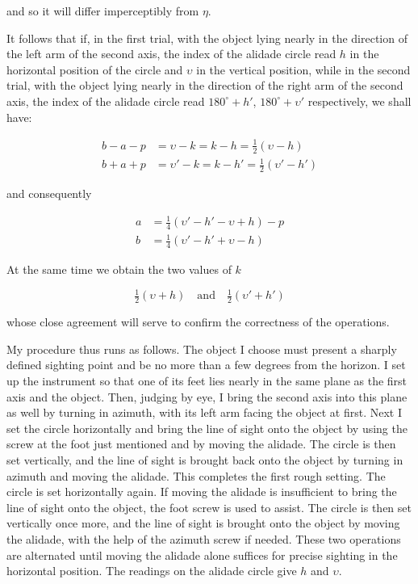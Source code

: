 \noindent and so it will differ imperceptibly from $\eta$.

\par\indent It follows that if, in the first trial, with the object lying nearly in the direction of the left arm of the second axis, the index of the alidade circle read $h$ in the horizontal position of the circle and $\upsilon$ in the vertical position, while in the second trial, with the object lying nearly in the direction of the right arm of the second axis, the index of the alidade circle read $180^\circ+h'$, $180^\circ+\upsilon'$ respectively, we shall have:

\[ \begin{aligned} b-a-p &= \upsilon-k = k-h = \tfrac{1}{2}(\upsilon-h) \\ b+a+p &= \upsilon'-k = k-h' = \tfrac{1}{2}(\upsilon'-h') \end{aligned} \]

\noindent and consequently

\[ \begin{aligned} a &= \tfrac{1}{4}(\upsilon'-h'-\upsilon+h)-p \\ b &= \tfrac{1}{4}(\upsilon'-h'+\upsilon-h) \end{aligned} \]

\noindent At the same time we obtain the two values of $k$

\[ \tfrac{1}{2}(\upsilon+h) \quad\text{and}\quad \tfrac{1}{2}(\upsilon'+h') \]

\noindent whose close agreement will serve to confirm the correctness of the operations.

\par\indent My procedure thus runs as follows. The object I choose must present a sharply defined sighting point and be no more than a few degrees from the horizon. I set up the instrument so that one of its feet lies nearly in the same plane as the first axis and the object. Then, judging by eye, I bring the second axis into this plane as well by turning in azimuth, with its left arm facing the object at first. Next I set the circle horizontally and bring the line of sight onto the object by using the screw at the foot just mentioned and by moving the alidade. The circle is then set vertically, and the line of sight is brought back onto the object by turning in azimuth and moving the alidade. This completes the first rough setting. The circle is set horizontally again. If moving the alidade is insufficient to bring the line of sight onto the object, the foot screw is used to assist. The circle is then set vertically once more, and the line of sight is brought onto the object by moving the alidade, with the help of the azimuth screw if needed. These two operations are alternated until moving the alidade alone suffices for precise sighting in the horizontal position. The readings on the alidade circle give $h$ and $\upsilon$.

